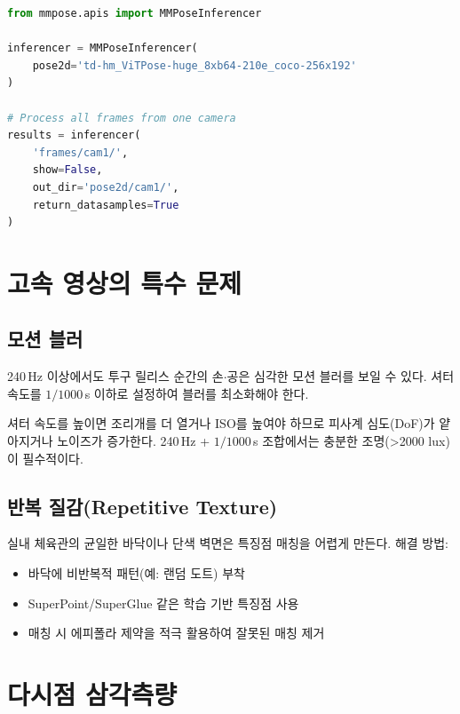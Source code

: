 \documentclass[11pt, a4paper]{report}
\begin{document}
\begin{codebox}[title={MMPose를 이용한 배치 추론}]
\begin{lstlisting}[language=Python]
from mmpose.apis import MMPoseInferencer

inferencer = MMPoseInferencer(
    pose2d='td-hm_ViTPose-huge_8xb64-210e_coco-256x192'
)

# Process all frames from one camera
results = inferencer(
    'frames/cam1/',
    show=False,
    out_dir='pose2d/cam1/',
    return_datasamples=True
)
\end{lstlisting}
\end{codebox}

\section{고속 영상의 특수 문제}

\subsection{모션 블러}

240\,Hz 이상에서도 투구 릴리스 순간의 손$\cdot$공은 심각한 모션 블러를 보일 수 있다.
셔터 속도를 $1/1000$\,s 이하로 설정하여 블러를 최소화해야 한다.

\begin{importantnote}
셔터 속도를 높이면 조리개를 더 열거나 ISO를 높여야 하므로
피사계 심도(DoF)가 얕아지거나 노이즈가 증가한다.
240\,Hz + $1/1000$\,s 조합에서는 충분한 조명(>2000 lux)이 필수적이다.
\end{importantnote}

\subsection{반복 질감(Repetitive Texture)}

실내 체육관의 균일한 바닥이나 단색 벽면은 특징점 매칭을 어렵게 만든다.
해결 방법:
\begin{itemize}[nosep]
  \item 바닥에 비반복적 패턴(예: 랜덤 도트) 부착
  \item SuperPoint/SuperGlue 같은 학습 기반 특징점 사용
  \item 매칭 시 에피폴라 제약을 적극 활용하여 잘못된 매칭 제거
\end{itemize}

\section{다시점 삼각측량}
\end{document}
